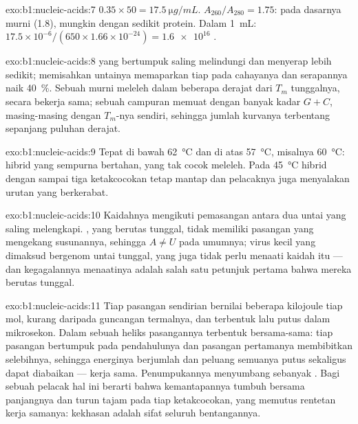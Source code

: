 \begin{solution}{exo:b1:nucleic-acids:7}
$0.35\times 50 = \qty{17.5}{\micro g/mL}$. $A_{260}/A_{280} = 1.75$:
pada dasarnya  murni (1.8), mungkin dengan sedikit protein. Dalam
\qty{1}{mL}: $17.5\times 10^{-6}/(650\times 1.66\times 10^{-24}) =
\num{1.6e16}$ .
\end{solution}

\begin{solution}{exo:b1:nucleic-acids:8}
 yang bertumpuk saling melindungi dan menyerap lebih sedikit;
memisahkan untainya memaparkan tiap  pada cahayanya dan serapannya
naik \qty{40}{\%}. Sebuah  murni meleleh dalam beberapa derajat dari
$T_m$ tunggalnya, secara bekerja sama; sebuah campuran memuat 
dengan banyak kadar $G + C$, masing-masing dengan $T_m$-nya sendiri,
sehingga jumlah kurvanya terbentang sepanjang puluhan derajat.
\end{solution}

\begin{solution}{exo:b1:nucleic-acids:9}
Tepat di bawah \qty{62}{\celsius} dan di atas \qty{57}{\celsius},
misalnya \qty{60}{\celsius}: hibrid yang sempurna bertahan, yang tak
cocok meleleh. Pada \qty{45}{\celsius} hibrid dengan sampai tiga
ketakcocokan tetap mantap dan pelacaknya juga menyalakan urutan yang
berkerabat.
\end{solution}

\begin{solution}{exo:b1:nucleic-acids:10}
Kaidahnya mengikuti pemasangan  antara dua untai yang saling
melengkapi. , yang berutas tunggal, tidak memiliki pasangan yang
mengekang susunannya, sehingga $A \neq U$ pada umumnya; virus kecil
yang dimaksud bergenom  untai tunggal, yang juga tidak perlu menaati
kaidah itu --- dan kegagalannya menaatinya adalah salah satu petunjuk
pertama bahwa mereka berutas tunggal.
\end{solution}

\begin{solution}{exo:b1:nucleic-acids:11}
Tiap pasangan sendirian bernilai beberapa kilojoule tiap mol, kurang
daripada guncangan termalnya, dan terbentuk lalu putus dalam mikrosekon.
Dalam sebuah heliks pasangannya terbentuk bersama-sama: tiap pasangan
bertumpuk pada pendahulunya dan pasangan pertamanya membibitkan
selebihnya, sehingga energinya berjumlah dan peluang semuanya putus
sekaligus dapat diabaikan --- kerja sama. Penumpukannya menyumbang
sebanyak . Bagi sebuah pelacak hal ini berarti bahwa
kemantapannya tumbuh bersama panjangnya dan turun tajam pada tiap
ketakcocokan, yang memutus rentetan kerja samanya: kekhasan adalah sifat
seluruh bentangannya.
\end{solution}

